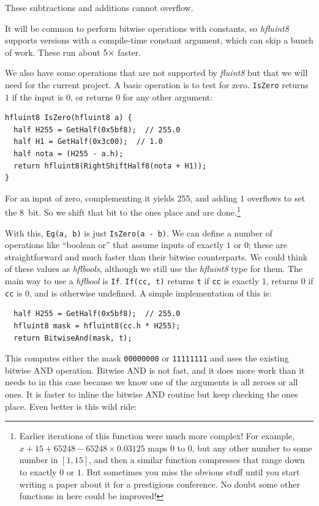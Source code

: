 \documentclass[twocolumn]{article}
\begin{document}
These subtractions and additions cannot overflow.

\smallskip
It will be common to perform bitwise operations with constants, so
{\it hfluint8} supports versions with a compile-time constant
argument, which can skip a bunch of work. These run about $5{}{\scriptsize \times}$
faster.

We also have some operations that are not supported by {\it fluint8}
but that we will need for the current project. A basic operation is
to test for zero. \verb|IsZero| returns $1$ if the input is $0$, or
returns $0$ for any other argument:

\begin{lstlisting}
hfluint8 IsZero(hfluint8 a) {
  half H255 = GetHalf(0x5bf8);  // 255.0
  half H1 = GetHalf(0x3c00);  // 1.0
  half nota = (H255 - a.h);
  return hfluint8(RightShiftHalf8(nota + H1));
}
\end{lstlisting}

For an input of zero, complementing it yields 255, and adding $1$
overflows to set the 8\th\ bit. So we shift that bit to the ones
place and are done.\footnote{Earlier iterations of this function
  were much more complex! For example, $x + 15 + 65248 - 65248 \times 0.03125$
  maps $0$ to $0$, but any other number to some number in $[1, 15]$,
  and then a similar function compresses that range down to exactly $0$ or $1$.
  But sometimes you miss the obvious stuff until you start writing
  a paper about it for a prestigious conference. No doubt some other
  functions in here could be improved!}

With this, \verb+Eq(a, b)+ is just \verb+IsZero(a - b)+. We can define
a number of operations like ``boolean or'' that assume inputs of
exactly $1$ or $0$; these are straightforward and much faster than
their bitwise counterparts. We could think of these values as {\it
  hflbools}, although we still use the {\it hfluint8} type for them.
The main way to use a {\it hflbool} is \verb+If+.
\verb|If(cc, t)| returns \verb+t+ if \verb+cc+ is exactly $1$,
returns $0$ if \verb+cc+ is $0$, and is otherwise undefined. A
simple implementation of this is:

\begin{lstlisting}
  half H255 = GetHalf(0x5bf8);  // 255.0
  hfluint8 mask = hfluint8(cc.h * H255);
  return BitwiseAnd(mask, t);
\end{lstlisting}

This computes either the mask \verb+00000000+ or \verb+11111111+ and
uses the existing bitwise AND operation. Bitwise AND is not fast, and
it does more work than it needs to in this case because we know one of
the arguments is all zeroes or all ones. It is faster to inline the
bitwise AND routine but keep checking the ones place. Even better is
this wild ride:
\end{document}
